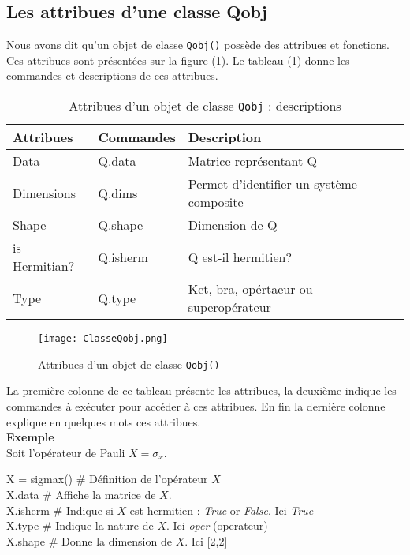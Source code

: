 \subsection{Les attribues d'une classe Qobj}

Nous avons dit qu'un objet de classe \texttt{Qobj()} possède des attribues et fonctions. Ces attribues sont présentées sur la figure (\ref{qobj}). Le tableau (\ref{class}) donne les commandes et descriptions de ces attribues.
\begin{table}[!h]
\begin{center}
\begin{tabular}{|l|l|l|} \hline \hline
\textbf{Attribues} &\textbf{Commandes}	&\textbf{Description}\\ \hline \hline
Data	&Q.data	&Matrice représentant Q\\ \hline
Dimensions	&Q.dims	&Permet d'identifier un système composite\\ \hline
Shape	&Q.shape	&Dimension de Q\\ \hline
is Hermitian?	&Q.isherm	&Q est-il hermitien?\\ \hline
Type	&Q.type	&Ket, bra, opértaeur ou superopérateur\\ \hline
\end{tabular}
\caption{Attribues d'un objet de classe \texttt{Qobj} : descriptions}
\label{class}
\end{center}
\end{table}

\begin{figure}[!h]
\begin{center}
\texttt{[image: ClasseQobj.png]}
\end{center}
\caption{Attribues d'un objet de classe \texttt{Qobj()}}
\label{qobj}
\end{figure}

La première colonne de ce tableau présente les attribues, la deuxième indique les commandes à exécuter pour accéder à ces attribues. En fin la dernière colonne explique en quelques mots ces attribues.\\
\textbf{Exemple}\\
Soit l'opérateur de Pauli $X=\sigma_x$.\\
\begin{tt}
X = sigmax() \# Définition de l'opérateur $X$\\
X.data \# Affiche la matrice de $X$.\\
X.isherm \# Indique si $X$ est hermitien : \emph{True} or \emph{False}. Ici \emph{True}\\
X.type \# Indique la nature de $X$. Ici \emph{oper} (operateur)\\
X.shape \# Donne la dimension de $X$. Ici [2,2]\\
\end{tt}

